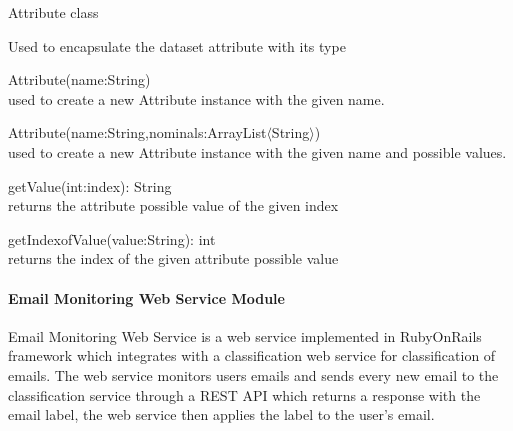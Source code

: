 \begin{my_itemize}
  \item Attribute class
  \begin{my_desc}
    \item[Purpose] Used to encapsulate the dataset attribute with its type
    \item[Functions] \hfill
    \begin{my_itemize}
      \item Attribute(name:String) \\
      used to create a new Attribute instance with the given name.
      \item Attribute(name:String,nominals:ArrayList$\langle$String$\rangle$) \\
      used to create a new Attribute instance with the given name and possible values.
      \item getValue(int:index): String \\
      returns the attribute possible value of the given index
      \item getIndexofValue(value:String): int \\
      returns the index of the given attribute possible value
    \end{my_itemize}

  \end{my_desc}

\end{my_itemize}

\paragraph{Email Monitoring Web Service Module}

Email Monitoring Web Service is a web service implemented in RubyOnRails \cite{ROR} framework which integrates 
with a classification web service for classification of emails. The web service monitors 
users emails and sends every new email to the classification service through a REST API \cite{REST}
which returns a response with the email label, the web service then applies the label to the user’s email.

